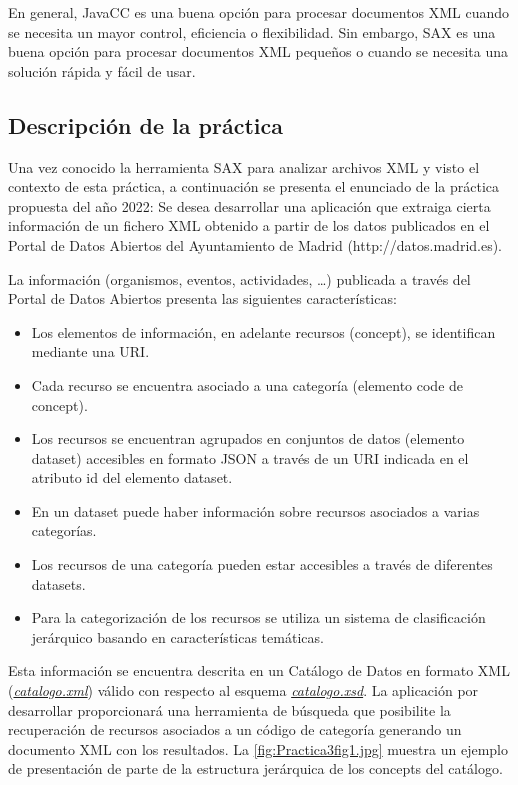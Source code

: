 En general, JavaCC es una buena opción para procesar documentos XML cuando se necesita un mayor control, eficiencia o flexibilidad. Sin embargo, SAX es una buena opción para procesar documentos XML pequeños o cuando se necesita una solución rápida y fácil de usar.

\subsection{Descripción de la práctica}

\noindent Una vez conocido la herramienta SAX para analizar archivos XML y visto el contexto de esta práctica, a continuación se presenta el enunciado de la práctica propuesta del año 2022:
Se desea desarrollar una aplicación que extraiga cierta información de un fichero XML obtenido a partir de los datos publicados en el Portal de Datos Abiertos del Ayuntamiento de Madrid (http://datos.madrid.es).

La información (organismos, eventos, actividades, …) publicada a través del Portal de Datos Abiertos presenta las siguientes características:

\begin{itemize}
    \item Los elementos de información, en adelante recursos (concept), se identifican mediante una URI.
    \item Cada recurso se encuentra asociado a una categoría (elemento code de concept).
    \item Los recursos se encuentran agrupados en conjuntos de datos (elemento dataset) accesibles en formato JSON a través de un URI indicada en el atributo id del elemento dataset.
    \item En un dataset puede haber información sobre recursos asociados a varias categorías.
    \item Los recursos de una categoría pueden estar accesibles a través de diferentes datasets.
    \item Para la categorización de los recursos se utiliza un sistema de clasificación jerárquico basando en características temáticas.
\end{itemize}

Esta información se encuentra descrita en un Catálogo de Datos en formato XML (\hyperref[sec:catalogoxml]{\textit{catalogo.xml}}) válido con respecto al esquema \hyperref[sec:catalogoxsd]{\textit{catalogo.xsd}}.
La aplicación por desarrollar proporcionará una herramienta de búsqueda que posibilite la recuperación de recursos asociados a un código de categoría generando un documento XML con los resultados.
La \autoref{fig:Practica3fig1.jpg} muestra un ejemplo de presentación de parte de la estructura jerárquica de los concepts del catálogo.


